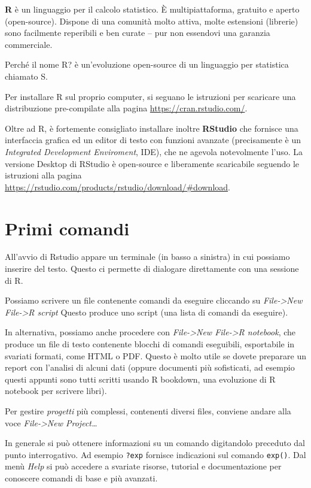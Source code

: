 \documentclass[
  italian,
  letterpaper,
]{book}
\theoremstyle{definition}
\theoremstyle{remark}
\begin{document}
\textbf{R} è un linguaggio per il calcolo statistico. È
multipiattaforma, gratuito e aperto (open-source). Dispone di una
comunità molto attiva, molte estensioni (librerie) sono facilmente
reperibili e ben curate -- pur non essendovi una garanzia commerciale.

Perché il nome R? è un'evoluzione open-source di un linguaggio per
statistica chiamato S.

Per installare R sul proprio computer, si seguano le istruzioni per
scaricare una distribuzione pre-compilate alla pagina
\url{https://cran.rstudio.com/}.

Oltre ad R, è fortemente consigliato installare inoltre \textbf{RStudio}
che fornisce una interfaccia grafica ed un editor di testo con funzioni
avanzate (precisamente è un \emph{Integrated Development Enviroment},
IDE), che ne agevola notevolmente l'uso. La versione Desktop di RStudio
è open-source e liberamente scaricabile seguendo le istruzioni alla
pagina \url{https://rstudio.com/products/rstudio/download/\#download}.

\section{Primi comandi}\label{primi-comandi}

All'avvio di Rstudio appare un terminale (in basso a sinistra) in cui
possiamo inserire del testo. Questo ci permette di dialogare
direttamente con una sessione di R.

Possiamo scrivere un file contenente comandi da eseguire cliccando su
\emph{File-\textgreater New File-\textgreater R script} Questo produce
uno script (una lista di comandi da eseguire).

In alternativa, possiamo anche procedere con \emph{File-\textgreater New
File-\textgreater R notebook}, che produce un file di testo contenente
blocchi di comandi eseguibili, esportabile in svariati formati, come
HTML o PDF. Questo è molto utile se dovete preparare un report con
l'analisi di alcuni dati (oppure documenti più sofisticati, ad esempio
questi appunti sono tutti scritti usando R bookdown, una evoluzione di R
notebook per scrivere libri).

Per gestire \emph{progetti} più complessi, contenenti diversi files,
conviene andare alla voce \emph{File-\textgreater New Project\ldots{}}

In generale si può ottenere informazioni su un comando digitandolo
preceduto dal punto interrogativo. Ad esempio \texttt{?exp} fornisce
indicazioni sul comando \texttt{exp()}. Dal menù \emph{Help} si può
accedere a svariate risorse, tutorial e documentazione per conoscere
comandi di base e più avanzati.
\end{document}
